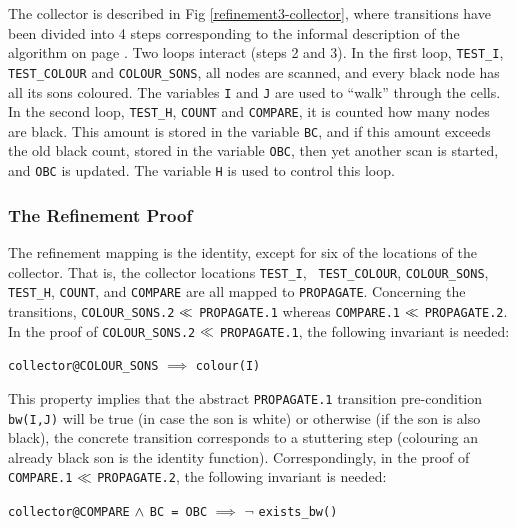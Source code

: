 \noindent The collector is described in Fig \ref{refinement3-collector}, 
where transitions have been 
divided into 4 steps corresponding  to the informal description of the
algorithm    on page    \pageref{the-collector-informal}\@.   Two  loops
interact (steps 2   and 3)\@.  In the   first loop, {\tt  TEST\_I}, {\tt
  TEST\_COLOUR} and   {\tt COLOUR\_SONS}, all   nodes are scanned, and
every black node has all its sons coloured. The variables {\tt I} and
{\tt J} are  used to ``walk'' through the  cells.  In the second loop,
{\tt TEST\_H}, {\tt COUNT}  and {\tt COMPARE},  it is counted how many
nodes are black.  This amount is stored in the  variable {\tt BC}, and
if this amount exceeds  the old  black count,  stored in  the variable
{\tt OBC}, then yet another scan is started, and {\tt OBC} is updated.
The variable {\tt H} is used to control this loop.


\subsubsection{The Refinement Proof}

The refinement mapping  is the identity, except  for six of the locations
of  the collector.  That is,  the collector locations {\tt TEST\_I}, {\tt
  TEST\_COLOUR}, {\tt COLOUR\_SONS}, {\tt  TEST\_H}, {\tt COUNT},  and
{\tt COMPARE} are  all mapped to  {\tt  PROPAGATE}\@. 
Concerning   the  transitions,  
{\tt  COLOUR\_SONS.2} $\ll$ {\tt PROPAGATE.1} 
whereas  
{\tt COMPARE.1} $\ll$ {\tt PROPAGATE.2}.    
In  the   proof   of  
{\tt  COLOUR\_SONS.2} $\ll$ {\tt PROPAGATE.1}, 
the following invariant is needed:

\begin{center}
  {\tt collector@COLOUR\_SONS} $\implies$ {\tt colour(I)}
\end{center}

This property    implies   that the  abstract   {\tt    PROPAGATE.1}
transition pre-condition {\tt bw(I,J)} will be true (in case the son
is white)  or otherwise  (if  the  son is  also  black),  the concrete
transition corresponds to  a  stuttering  step (colouring an   already
black son is the identity function)\@.  Correspondingly, in the proof of
{\tt  COMPARE.1}  $\ll$  {\tt   PROPAGATE.2},  the  following
invariant is needed:

\begin{center}
  {\tt collector@COMPARE} $\wedge$ {\tt BC = OBC} $\implies$ 
  $\neg$ {\tt exists\_bw()}
\end{center}

